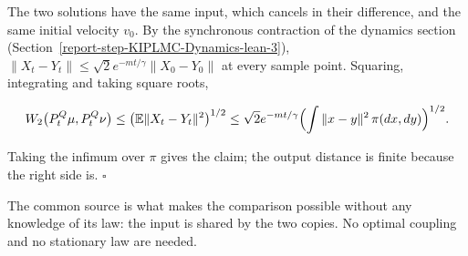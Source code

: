 \documentclass[11pt,a4paper]{report}
\begin{document}
The two solutions have the same input, which cancels in their difference, and the same initial velocity \(v_0\). By the synchronous contraction of the dynamics section (Section~\ref{report-step-KIPLMC-Dynamics-lean-3}), \(\|X_t-Y_t\|\le\sqrt2e^{-mt/\gamma}\|X_0-Y_0\|\) at every sample point. Squaring, integrating and taking square roots,


\[W_2\bigl(P^Q_t\mu,P^Q_t\nu\bigr)\le\bigl(\mathbb E\|X_t-Y_t\|^2\bigr)^{1/2}\le\sqrt2e^{-mt/\gamma}\Bigl(\int\|x-y\|^2\,\pi(dx,dy)\Bigr)^{1/2}.\]


Taking the infimum over \(\pi\) gives the claim; the output distance is finite because the right side is. \(\square\)




The common source is what makes the comparison possible without any knowledge of its law: the input is shared by the two copies. No optimal coupling and no stationary law are needed.
\end{document}
